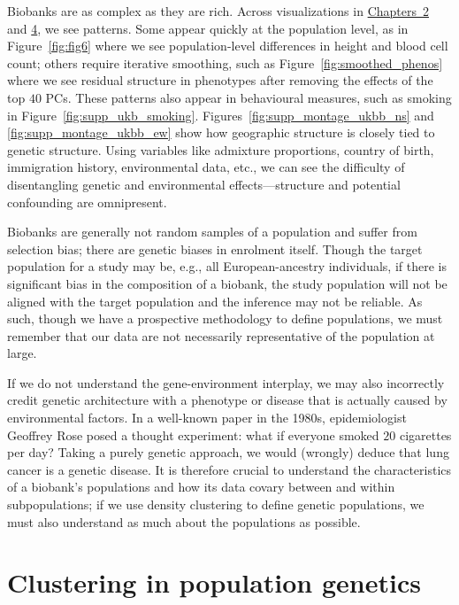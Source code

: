Biobanks are as complex as they are rich. Across visualizations in \hyperref[chap:chapter2]{Chapters~2} and \hyperref[chap:chapter4]{4}, we see patterns. Some appear quickly at the population level, as in Figure~\ref{fig:fig6} where we see population-level differences in height and blood cell count; others require iterative smoothing, such as  Figure~\ref{fig:smoothed_phenos} where we see residual structure in phenotypes after removing the effects of the top $40$ PCs. These patterns also appear in behavioural measures, such as smoking in Figure~\ref{fig:supp_ukb_smoking}. Figures~\ref{fig:supp_montage_ukbb_ns} and \ref{fig:supp_montage_ukbb_ew} show how geographic structure is closely tied to genetic structure. Using variables like admixture proportions, country of birth, immigration history, environmental data, etc., we can see the difficulty of disentangling genetic and environmental effects---structure and potential confounding are omnipresent.

Biobanks are generally not random samples of a population and suffer from selection bias\citep{huang_representativeness_2021}; there are genetic biases in enrolment itself\citep{pirastu_genetic_2021,benonisdottir_studying_2023}. Though the target population for a study may be, e.g., all European-ancestry individuals, if there is significant bias in the composition of a biobank, the study population will not be aligned with the target population and the inference may not be reliable. As such, though we have a prospective methodology to define populations, we must remember that our data are not necessarily representative of the population at large.

If we do not understand the gene-environment interplay, we may also incorrectly credit genetic architecture with a phenotype or disease that is actually caused by environmental factors. In a well-known paper in the 1980s\citep{rose_sick_2001}, epidemiologist Geoffrey Rose posed a thought experiment: what if everyone smoked $20$ cigarettes per day? Taking a purely genetic approach, we would (wrongly) deduce that lung cancer is a genetic disease. It is therefore crucial to understand the characteristics of a biobank's populations and how its data covary between and within subpopulations; if we use density clustering to define genetic populations, we must also understand as much about the populations as possible.

\section{Clustering in population genetics}

